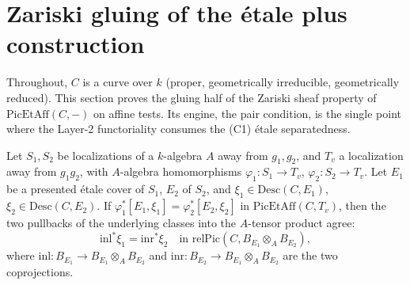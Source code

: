 \section{Zariski gluing of the \'etale plus construction}

Throughout, \(C\) is a curve over \(k\) (proper, geometrically irreducible, geometrically reduced).
This section proves the gluing half of the Zariski sheaf property of \(\mathrm{PicEtAff}(C, -)\) on
affine tests. Its engine, the pair condition, is the single point where the Layer-2 functoriality
consumes the (C1) \'etale separatedness.

\begin{theorem}
  \label{thm:PicEtAff_pair_condition}
  \leanok
  Let \(S_1, S_2\) be localizations of a \(k\)-algebra \(A\) away from \(g_1, g_2\), and \(T_v\) a
  localization away from \(g_1 g_2\), with \(A\)-algebra homomorphisms \(\varphi_1 \colon S_1 \to
  T_v\), \(\varphi_2 \colon S_2 \to T_v\). Let \(E_1\) be a presented \'etale cover of \(S_1\),
  \(E_2\) of \(S_2\), and \(\xi_1 \in \mathrm{Desc}(C, E_1)\), \(\xi_2 \in \mathrm{Desc}(C, E_2)\).
  If \(\varphi_1^{*}[E_1, \xi_1] = \varphi_2^{*}[E_2, \xi_2]\) in \(\mathrm{PicEtAff}(C, T_v)\), then
  the two pullbacks of the underlying classes into the \(A\)-tensor product agree:
  \[
    \mathrm{inl}^{*}\xi_1 = \mathrm{inr}^{*}\xi_2 \quad\text{in } \mathrm{relPic}(C, B_{E_1}
    \otimes_A B_{E_2}),
  \]
  where \(\mathrm{inl} \colon B_{E_1} \to B_{E_1} \otimes_A B_{E_2}\) and \(\mathrm{inr} \colon
  B_{E_2} \to B_{E_1} \otimes_A B_{E_2}\) are the two coprojections.
\end{theorem}
